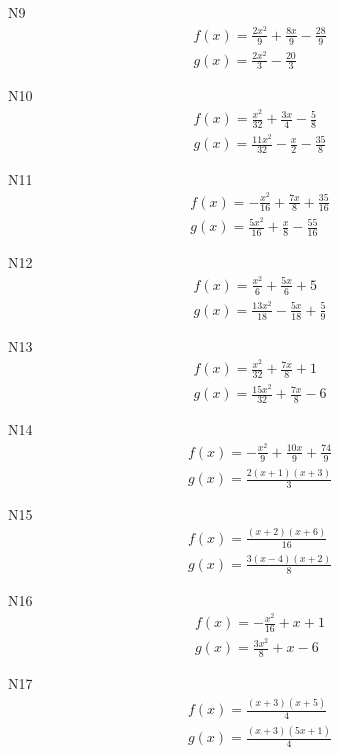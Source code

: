 \documentclass[11pt]{report}
\begin{document}
N9
\begin{align*}
 f(x) = \frac{2 x^{2}}{9} + \frac{8 x}{9} - \frac{28}{9}\\
 g(x) = \frac{2 x^{2}}{3} - \frac{20}{3}
\end{align*}

N10
\begin{align*}
 f(x) = \frac{x^{2}}{32} + \frac{3 x}{4} - \frac{5}{8}\\
 g(x) = \frac{11 x^{2}}{32} - \frac{x}{2} - \frac{35}{8}
\end{align*}

N11
\begin{align*}
 f(x) = - \frac{x^{2}}{16} + \frac{7 x}{8} + \frac{35}{16}\\
 g(x) = \frac{5 x^{2}}{16} + \frac{x}{8} - \frac{55}{16}
\end{align*}

N12
\begin{align*}
 f(x) = \frac{x^{2}}{6} + \frac{5 x}{6} + 5\\
 g(x) = \frac{13 x^{2}}{18} - \frac{5 x}{18} + \frac{5}{9}
\end{align*}

N13
\begin{align*}
 f(x) = \frac{x^{2}}{32} + \frac{7 x}{8} + 1\\
 g(x) = \frac{15 x^{2}}{32} + \frac{7 x}{8} - 6
\end{align*}

N14
\begin{align*}
 f(x) = - \frac{x^{2}}{9} + \frac{10 x}{9} + \frac{74}{9}\\
 g(x) = \frac{2 \left(x + 1\right) \left(x + 3\right)}{3}
\end{align*}

N15
\begin{align*}
 f(x) = \frac{\left(x + 2\right) \left(x + 6\right)}{16}\\
 g(x) = \frac{3 \left(x - 4\right) \left(x + 2\right)}{8}
\end{align*}

N16
\begin{align*}
 f(x) = - \frac{x^{2}}{16} + x + 1\\
 g(x) = \frac{3 x^{2}}{8} + x - 6
\end{align*}

N17
\begin{align*}
 f(x) = \frac{\left(x + 3\right) \left(x + 5\right)}{4}\\
 g(x) = \frac{\left(x + 3\right) \left(5 x + 1\right)}{4}
\end{align*}
\end{document}
